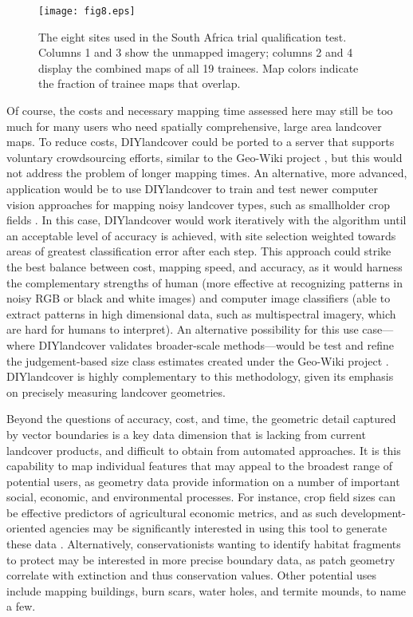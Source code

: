 \documentclass[preprint,12pt,authoryear]{elsarticle}
\begin{document}
\begin{figure}[!ht]
  \begin{center}
    \texttt{[image: fig8.eps]}
    \caption{The eight sites used in the South Africa trial qualification test. Columns 1 and 3 show the unmapped imagery; columns 2 and 4 display the combined maps of all 19 trainees.  Map colors indicate the fraction of trainee maps that overlap. } 
    \label{default}
  \end{center}
\end{figure}

Of course, the costs and necessary mapping time assessed here may still be too much for many users who need spatially comprehensive, large area landcover maps. To reduce costs, DIYlandcover could be ported to a server that supports voluntary crowdsourcing efforts, similar to the Geo-Wiki project \citep{fritz_geo-wiki:_2012}, but this would not address the problem of longer mapping times. An alternative, more advanced, application would be to use DIYlandcover to train and test newer computer vision approaches for mapping noisy landcover types, such as smallholder crop fields \citep[e.g.][]{debats_generalized_2015}. In this case, DIYlandcover would work iteratively with the algorithm until an acceptable level of accuracy is achieved, with site selection weighted towards areas of greatest classification error after each step. This approach could strike the best balance between cost, mapping speed, and accuracy, as it would harness the complementary strengths of human (more effective at recognizing patterns in noisy RGB or black and white images) and computer image classifiers (able to extract patterns in high dimensional data, such as multispectral imagery, which are hard for humans to interpret).  An alternative possibility for this use case---where DIYlandcover validates broader-scale methods---would be test and refine the judgement-based size class estimates created under the Geo-Wiki project \citep{fritz_mapping_2015}. DIYlandcover is highly complementary to this methodology, given its emphasis on precisely measuring landcover geometries.   

Beyond the questions of accuracy, cost, and time, the geometric detail captured by vector boundaries is a key data dimension that is lacking from current landcover products, and difficult to obtain from automated approaches. It is this capability to map individual features that may appeal to the broadest range of potential users, as geometry data provide information on a number of important social, economic, and environmental processes. For instance, crop field sizes can be effective predictors of agricultural economic metrics, and as such development-oriented agencies may be significantly interested in using this tool to generate these data \citep{fritz_mapping_2015}. Alternatively, conservationists wanting to identify habitat fragments to protect may be interested in more precise boundary data, as patch geometry correlate with extinction \citep{laurance_fate_2011} and thus conservation values. Other potential uses include mapping buildings, burn scars, water holes, and termite mounds, to name a few.  
\end{document}
